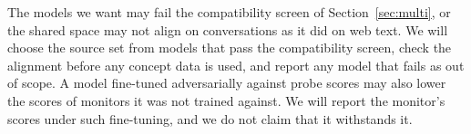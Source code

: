 \documentclass{article}
\begin{document}
The models we want may fail the compatibility screen of Section~\ref{sec:multi}, or the shared space may not align on conversations as it did on web text. We will choose the source set from models that pass the compatibility screen, check the alignment before any concept data is used, and report any model that fails as out of scope. A model fine-tuned adversarially against probe scores may also lower the scores of monitors it was not trained against. We will report the monitor's scores under such fine-tuning, and we do not claim that it withstands it.



\end{document}
